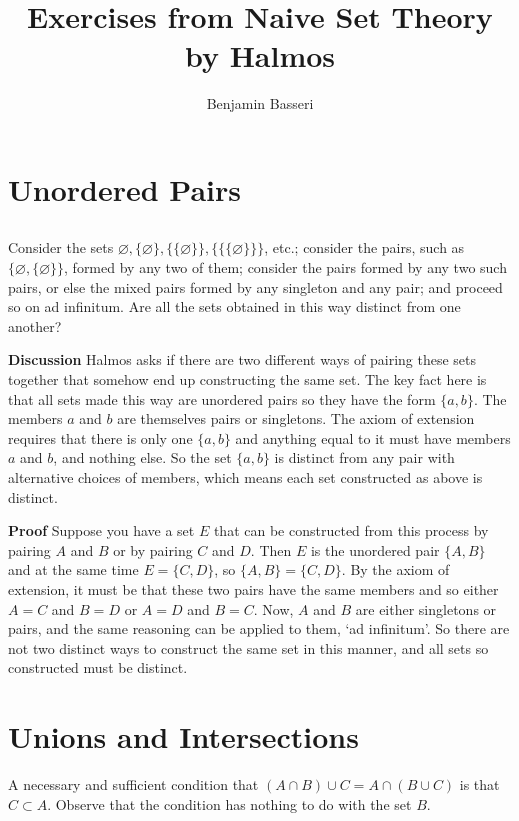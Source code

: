 \documentclass{article}
\title{Exercises from Naive Set Theory by Halmos}
\author{Benjamin Basseri}
\date{ }
\begin{document}
\maketitle

\setcounter{section}{2}
\section{Unordered Pairs}

\subsection{} Consider the sets $\varnothing, \{\varnothing\}, \{\{\varnothing\}\}, \{\{\{\varnothing\}\}\}$, etc.; consider the pairs, such as $\{\varnothing, \{\varnothing\}\}$, formed by any two of them; consider the pairs formed by any two such pairs, or else the mixed pairs formed by any singleton and any pair; and proceed so on ad infinitum. Are all the sets obtained in this way distinct from one another?

\textbf{Discussion} Halmos asks if there are two different ways of pairing these sets together that somehow end up constructing the same set. The key fact here is that all sets made this way are unordered pairs so they have the form $\{a, b\}$. The members $a$ and $b$ are themselves pairs or singletons. The axiom of extension requires that there is only one $\{a, b\}$ and anything equal to it must have members $a$ and $b$, and nothing else. So the set $\{a, b\}$ is distinct from any pair with alternative choices of members, which means each set constructed as above is distinct.

\textbf{Proof} Suppose you have a set $E$ that can be constructed from this process by pairing $A$ and $B$ or by pairing $C$ and $D$. Then $E$ is the unordered pair $\{A, B\}$ and at the same time $E = \{C, D\}$, so $\{A, B\} = \{C, D\}$. By the axiom of extension, it must be that these two pairs have the same members and so either $A = C$ and $B = D$ or $A = D$ and $B = C$. Now, $A$ and $B$ are either singletons or pairs, and the same reasoning can be applied to them, `ad infinitum'. So there are not two distinct ways to construct the same set in this manner, and all sets so constructed must be distinct.

\section{Unions and Intersections}

A necessary and sufficient condition that $(A \cap B) \cup C = A \cap (B \cup C)$ is that $C \subset A$. Observe that the condition has nothing to do with the set $B$.
\end{document}
